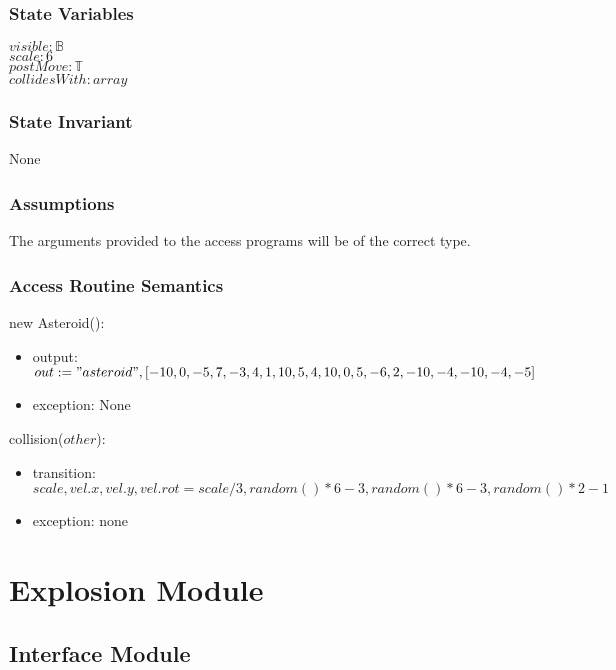 \documentclass[12pt]{article}
\begin{document}
\subsubsection* {State Variables}


$visible: \mathbb{B}$\\
$scale: 6$\\
$postMove: \mathbb{T}$\\
$collidesWith: array$\\

\subsubsection* {State Invariant}
None

\subsubsection* {Assumptions}

The arguments provided to the access programs will be of the correct type.

\subsubsection* {Access Routine Semantics}

\noindent new Asteroid():
\begin{itemize}
\item output: $out := "asteroid", [-10,   0,
              -5,   7,
              -3,   4,
               1,  10,
               5,   4,
              10,   0,
               5,  -6,
               2, -10,
              -4, -10,
              -4,  -5]$
\item exception: None
\end{itemize}

\noindent collision($other$):
\begin{itemize}
\item transition: $scale, vel.x, vel.y, vel.rot = scale/3,random() * 6 - 3, random() * 6 - 3, random() * 2 - 1$
\item exception: none
\end{itemize}

\newpage

\section* {Explosion Module}

\subsection*{Interface Module}
\end{document}
